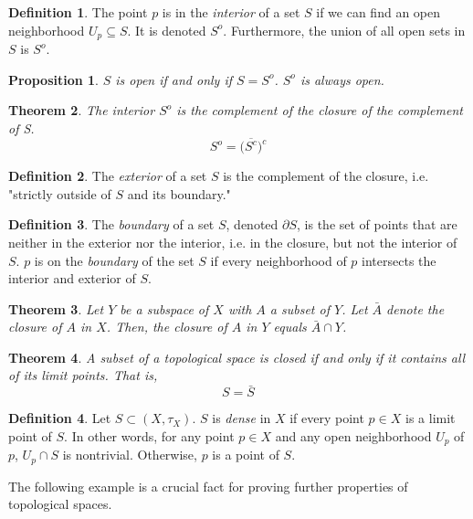\documentclass{article}
\newtheorem{theorem}{Theorem}[section]
\newtheorem{proposition}[theorem]{Proposition}
\theoremstyle{remark}
\theoremstyle{definition}
\newtheorem{definition}{Definition}[section]
\begin{document}
\begin{definition}
The point $p$ is in the \textit{interior} of a set $S$ if we can find an open neighborhood $U_p \subseteq S$. It is denoted $S^{o}$. Furthermore, the union of all open sets in $S$ is $S^{o}$. 
\end{definition}

\begin{proposition}
$S$ is open if and only if $S = S^{o}$. $S^{o}$ is always open.
\end{proposition}

\begin{theorem}
The interior $S^{o}$ is the complement of the closure of the complement of S. \[ S^{o} = \big(\overline{S^{c}}\big)^{c}\]
\end{theorem}

\begin{definition}
The \textit{exterior} of a set $S$ is the complement of the closure, i.e. "strictly outside of $S$ and its boundary."
\end{definition}

\begin{definition}
The \textit{boundary} of a set $S$, denoted $\partial S$, is the set of points that are neither in the exterior nor the interior, i.e. in the closure, but not the interior of $S$. $p$ is on the \textit{boundary} of the set $S$ if every neighborhood of $p$ intersects the interior and exterior of $S$.  
\end{definition}

\begin{theorem}
Let $Y$ be a subspace of $X$ with $A$ a subset of $Y$. Let $\bar{A}$ denote the closure of $A$ in $X$. Then, the closure of $A$ in $Y$ equals $\bar{A} \cap Y$. 
\end{theorem}

\begin{theorem}
A subset of a topological space is closed if and only if it contains all of its limit points. That is, 
\[S = \bar{S}\]
\end{theorem}

\begin{definition}
Let $S \subset (X, \tau_X)$. $S$ is \textit{dense} in $X$ if every point $p \in X$ is a limit point of $S$. In other words, for any point $p \in X$ and any open neighborhood $U_p$ of $p$, $U_p \cap S$ is nontrivial. Otherwise, $p$ is a point of $S$. 
\end{definition}

The following example is a crucial fact for proving further properties of topological spaces. 
\end{document}
